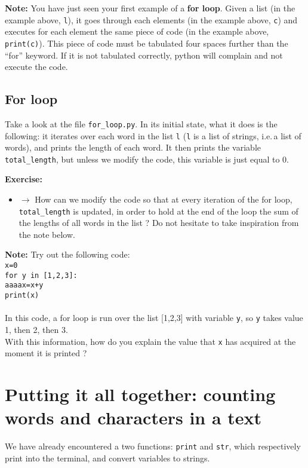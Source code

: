 \documentclass{article}
\newcommand{\note}[1]{
\begin{mdframed}[backgroundcolor=green!30!white]
\textbf{Note:} #1
\end{mdframed}
}
\newcommand{\exercise}[1]{
\begin{mdframed}[backgroundcolor=black!20!white]
\textbf{Exercise:} #1
\end{mdframed}
}
\begin{document}
\note{You have just seen your first example of a \textbf{for loop}.
Given a list (in the example above, {\tt l}), it goes through each elements
(in the example above, {\tt c}) and executes for each element the
same piece of code (in the example above, {\tt print(c)}). 
This piece of code must be tabulated four spaces further than the ``for'' keyword.
If it is not tabulated correctly, python will complain and not
execute the code.
}

\subsection{For loop}

Take a look at the file {\tt for\_loop.py}.
In its initial state, what it does is the following:
it iterates over each word in the list {\tt l} ({\tt l} is 
a list of strings, i.e.\,a list of words), and
prints the length of each word.
It then prints the variable {\tt total\_length}, but unless we modify
the code, this variable is just equal to 0.

\exercise{
\begin{itemize}
    \item $\rightarrow$ How can we modify the code so that
        at every iteration of the for loop, {\tt total\_length}
        is updated, in order to hold at the end of the loop the sum
        of the lengths of all words in the list ?
        Do not hesitate to take inspiration from the note below.
\end{itemize}
}


\note{Try out the following code:\\
{\tt x=0}\\
{\tt for y in [1,2,3]:}\\
{\tt \textcolor{green!30!white}{aaaa}x=x+y}\\
{\tt print(x)}
\\~\\
In this code, a for loop is run over the list [1,2,3] with variable {\tt y},
so {\tt y} takes value 1, then 2, then 3.\\
With this information, how do you explain the value that {\tt x} has acquired
at the moment
it is printed ?
}
\section{Putting it all together: counting words and characters in a text}

We have already encountered a two functions: {\tt print} and {\tt str},
which respectively print into the terminal, and convert variables to strings.
\end{document}
